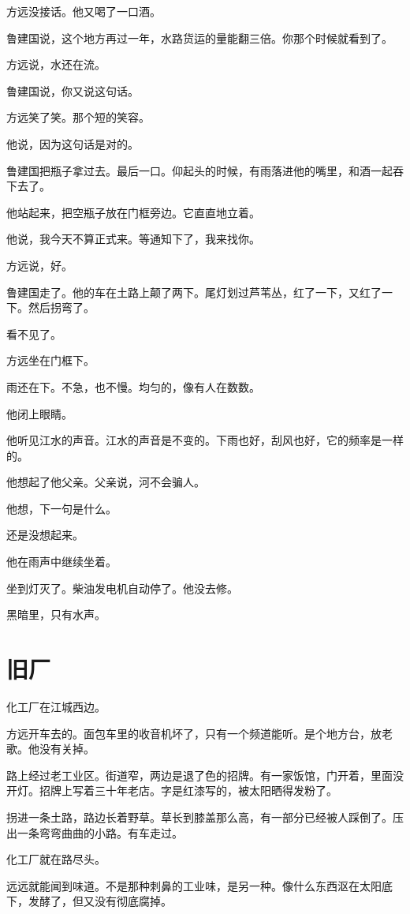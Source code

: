 \documentclass[UTF8,a5paper,11pt,openany]{ctexbook}
\begin{document}
方远没接话。他又喝了一口酒。

鲁建国说，这个地方再过一年，水路货运的量能翻三倍。你那个时候就看到了。

方远说，水还在流。

鲁建国说，你又说这句话。

方远笑了笑。那个短的笑容。

他说，因为这句话是对的。

鲁建国把瓶子拿过去。最后一口。仰起头的时候，有雨落进他的嘴里，和酒一起吞下去了。

他站起来，把空瓶子放在门框旁边。它直直地立着。

他说，我今天不算正式来。等通知下了，我来找你。

方远说，好。

鲁建国走了。他的车在土路上颠了两下。尾灯划过芦苇丛，红了一下，又红了一下。然后拐弯了。

看不见了。

方远坐在门框下。

雨还在下。不急，也不慢。均匀的，像有人在数数。

他闭上眼睛。

他听见江水的声音。江水的声音是不变的。下雨也好，刮风也好，它的频率是一样的。

他想起了他父亲。父亲说，河不会骗人。

他想，下一句是什么。

还是没想起来。

他在雨声中继续坐着。

坐到灯灭了。柴油发电机自动停了。他没去修。

黑暗里，只有水声。

\clearpage

\chapter{旧厂}
\indent
化工厂在江城西边。

方远开车去的。面包车里的收音机坏了，只有一个频道能听。是个地方台，放老歌。他没有关掉。

路上经过老工业区。街道窄，两边是退了色的招牌。有一家饭馆，门开着，里面没开灯。招牌上写着三十年老店。字是红漆写的，被太阳晒得发粉了。

拐进一条土路，路边长着野草。草长到膝盖那么高，有一部分已经被人踩倒了。压出一条弯弯曲曲的小路。有车走过。

化工厂就在路尽头。

远远就能闻到味道。不是那种刺鼻的工业味，是另一种。像什么东西沤在太阳底下，发酵了，但又没有彻底腐掉。
\end{document}
